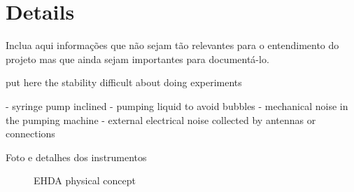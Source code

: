 \chapter{Details}

Inclua aqui informações que não sejam tão relevantes para o entendimento do projeto mas que ainda sejam importantes para documentá-lo. 


put here the stability difficult about doing experiments

- syringe pump inclined
- pumping liquid to avoid bubbles
- mechanical noise in the pumping machine
- external electrical noise collected by antennas or connections

Foto e detalhes dos instrumentos

\begin{figure}[H]
    \centering
    \caption{EHDA physical concept }
\end{figure}


